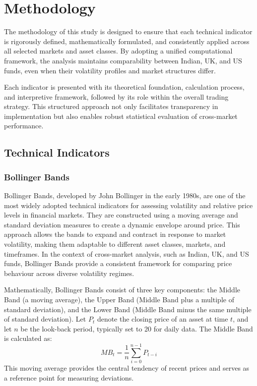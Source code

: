 \section{Methodology}

The methodology of this study is designed to ensure that each technical indicator is rigorously defined, mathematically formulated, and consistently applied across all selected markets and asset classes. By adopting a unified computational framework, the analysis maintains comparability between Indian, UK, and US funds, even when their volatility profiles and market structures differ. 

Each indicator is presented with its theoretical foundation, calculation process, and interpretive framework, followed by its role within the overall trading strategy. This structured approach not only facilitates transparency in implementation but also enables robust statistical evaluation of cross-market performance.


\subsection{Technical Indicators}


\subsubsection{Bollinger Bands}
Bollinger Bands, developed by John Bollinger in the early 1980s, are one of the most widely adopted technical indicators for assessing volatility and relative price levels in financial markets. They are constructed using a moving average and standard deviation measures to create a dynamic envelope around price. This approach allows the bands to expand and contract in response to market volatility, making them adaptable to different asset classes, markets, and timeframes. In the context of cross-market analysis, such as Indian, UK, and US funds, Bollinger Bands provide a consistent framework for comparing price behaviour across diverse volatility regimes.

Mathematically, Bollinger Bands consist of three key components: the Middle Band (a moving average), the Upper Band (Middle Band plus a multiple of standard deviation), and the Lower Band (Middle Band minus the same multiple of standard deviation). Let $P_t$ denote the closing price of an asset at time $t$, and let $n$ be the look-back period, typically set to 20 for daily data. The Middle Band is calculated as:
\[
MB_t = \frac{1}{n} \sum_{i=0}^{n-1} P_{t-i}
\]
This moving average provides the central tendency of recent prices and serves as a reference point for measuring deviations.

